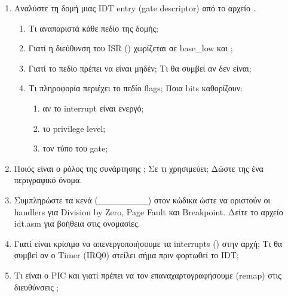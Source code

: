 \documentclass[18pt]{extarticle}
\begin{document}
\begin{question}
    \begin{enumerate}
        \item Αναλύστε τη δομή μιας IDT entry (gate descriptor) από το αρχείο .
        \begin{enumerate}
            \item Τι αναπαριστά κάθε πεδίο της δομής;
            \item Γιατί η διεύθυνση του ISR () χωρίζεται σε base\_low και ;
            \item Γιατί το πεδίο  πρέπει να είναι μηδέν; Τι θα συμβεί αν δεν είναι;
            \item Τι πληροφορία περιέχει το πεδίο flags; Ποια bits καθορίζουν:
            \begin{enumerate}
                \item αν το interrupt είναι ενεργό;
                \item το privilege level;
                \item τον τύπο του gate;
            \end{enumerate}
        \end{enumerate}
        \item Ποιός είναι ο ρόλος της συνάρτησης ; Σε τι χρησιμεύει; Δώστε της ένα περιγραφικό όνομα.
        \item Συμπληρώστε τα κενά (\_\_\_\_\_\_\_\_) στον κώδικα ώστε να οριστούν οι handlers για Division by Zero, Page Fault και Breakpoint. Δείτε το αρχείο idt.asm για βοήθεια στις ονομασίες.
        \item Γιατί είναι κρίσιμο να απενεργοποιήσουμε τα interrupts () στην αρχή; Τι θα συμβεί αν ο Timer (IRQ0) στείλει σήμα πριν φορτωθεί το IDT;
        \item Τι είναι ο PIC και γιατί πρέπει να τον επαναχαρτογραφήσουμε (remap) στις διευθύνσεις ; 
    \end{enumerate}

\end{question}
\end{document}

